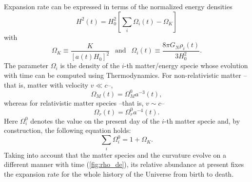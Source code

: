 Expansion rate can be expressed in terms of the normalized energy densities
\begin{equation}
H^2(t) = H_0^2\left[\sum_i\Omega_i(t)-\Omega_K\right]
\label{eq:flrw}
\end{equation}
with
\begin{equation}
\Omega_K\equiv\frac{K}{[a(t)H_0]^2}\ \ \mbox{ and }\ \ \Omega_i(t)\equiv \frac{8\pi G_N\rho_i(t)}{3H_0^2}.
\end{equation}
The parameter $\Omega_i$ is the density of the $i$-th matter/energy specie whose evolution with time can be computed using Thermodynamics. For non-relativistic matter --that is, matter with velocity $v\ll c$--, 
\begin{equation}
\Omega_M(t) = \Omega_M^0a^{-3}(t),
\end{equation}
whereas for relativistic matter species --that is, $v\sim c$--
\begin{equation}
\Omega_r(t) = \Omega_r^0 a^{-4}(t).
\end{equation}
Here $\Omega_i^0$ denotes the value on the present day of the $i$-th matter specie and, by construction, the following equation holds:
\begin{equation}
\sum_i\Omega_i^0=1+\Omega_K.
\label{eq:conservationenergy}
\end{equation}
Taking into account that the matter species and the curvature evolve on a different manner with time (\autoref{fig:rho_de}), its relative abundance at present fixes the expansion rate for the whole history of the Universe from birth to death.
